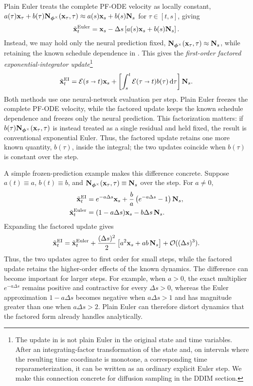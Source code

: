 Plain Euler treats the complete PF-ODE velocity as locally constant,
$a(\tau){\mathbf{x}}_\tau+
b(\tau){\mathbf{N}}_{\bm{\phi}^\times}({\mathbf{x}}_\tau,\tau)
\approx a(s){\mathbf{x}}_s+b(s){\mathbf{N}}_s$ for $\tau\in[t,s]$, giving
\begin{align}
\label{eq:euler-step}
\tilde{{\mathbf{x}}}_t^{\mathrm{Euler}}
=
{\mathbf{x}}_s
-
\Delta s
\left[
a(s){\mathbf{x}}_s+b(s){\mathbf{N}}_s
\right].
\end{align}
Instead, we may hold only the neural prediction fixed,
${\mathbf{N}}_{\bm{\phi}^\times}({\mathbf{x}}_\tau,\tau)\approx{\mathbf{N}}_s$, while retaining the
known schedule dependence in
. This gives the
\emph{first-order factored exponential-integrator update}\footnote{The update
in  is not plain Euler in the original state and time
variables. After an integrating-factor transformation of the state and, on intervals
where the resulting time coordinate is monotone, a corresponding time
reparameterization, it can be written as an ordinary explicit Euler step. We make this connection concrete for diffusion
sampling in the DDIM section.}
\begin{align}
\label{eq:factored-ei-step}
\tilde{{\mathbf{x}}}_t^{\mathrm{EI}}
=
\mathcal E(s\shortrightarrow t){\mathbf{x}}_s
+
\left[
\int_s^t
\mathcal E(\tau\shortrightarrow t)b(\tau)\mathop{}\!\mathrm{d}\tau
\right]{\mathbf{N}}_s.
\end{align}
Both methods use one neural-network evaluation per step. Plain Euler freezes
the complete PF-ODE velocity, while the factored update keeps the known
schedule dependence and freezes only the neural prediction. This factorization
matters: if
$b(\tau){\mathbf{N}}_{\bm{\phi}^\times}({\mathbf{x}}_\tau,\tau)$
is instead treated as a single residual and held fixed, the result is
conventional exponential Euler. Thus, the factored update retains one more
known quantity, $b(\tau)$, inside the integral; the two updates coincide when
$b(\tau)$ is constant over the step.

A simple frozen-prediction example makes this difference concrete. Suppose
$a(t)\equiv a$, $b(t)\equiv b$, and
${\mathbf{N}}_{\bm{\phi}^\times}({\mathbf{x}}_\tau,\tau)\equiv{\mathbf{N}}_s$ over the step. For
$a\neq0$,
\begin{align*}
\tilde{{\mathbf{x}}}_t^{\mathrm{EI}}
&=
e^{-a\Delta s}{\mathbf{x}}_s
+
\frac{b}{a}
\left(
e^{-a\Delta s}-1
\right){\mathbf{N}}_s,
\\
\tilde{{\mathbf{x}}}_t^{\mathrm{Euler}}
&=
(1-a\Delta s){\mathbf{x}}_s
-
b\Delta s\,{\mathbf{N}}_s.
\end{align*}
Expanding the factored update gives
\begin{align*}
\tilde{{\mathbf{x}}}_t^{\mathrm{EI}}
=
\tilde{{\mathbf{x}}}_t^{\mathrm{Euler}}
+
\frac{(\Delta s)^2}{2}
\left[
a^2{\mathbf{x}}_s
+
ab\,{\mathbf{N}}_s
\right]
+
\mathcal O((\Delta s)^3).
\end{align*}
Thus, the two updates agree to first order for small steps, while the factored
update retains the higher-order effects of the known dynamics. The difference
can become important for larger steps. For example, when $a>0$, the exact
multiplier $e^{-a\Delta s}$ remains positive and contractive for every
$\Delta s>0$, whereas the Euler approximation $1-a\Delta s$ becomes negative
when $a\Delta s>1$ and has magnitude greater than one when $a\Delta s>2$.
Plain Euler can therefore distort dynamics that the factored form already
handles analytically.

